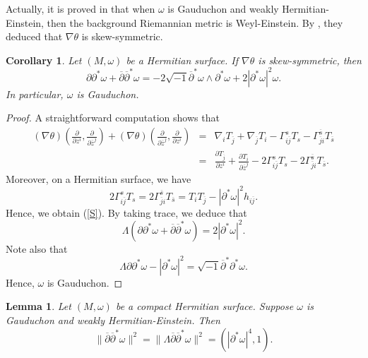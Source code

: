 \documentclass[12pt]{amsart}
\newcommand\bp{{\bar\partial}}
\theoremstyle{plain}
\newtheorem{lemma}[thm]{Lemma}
\newtheorem{cor}[thm]{Corollary}
\theoremstyle{definition}
\newcommand{\bcorollary}{\begin{cor}}
\newcommand{\ecorollary}{\end{cor}}
\newcommand{\bproof}{\begin{proof}}
\newcommand{\eproof}{\end{proof}}
\newcommand{\elemma}{\end{lemma}}
\newcommand{\blemma}{\begin{lemma}}
\newcommand{\sq}{\sqrt{-1}}
\newcommand{\p}{\partial}
\renewcommand{\bar}{\overline}
\newcommand{\beq}{\begin{equation}}
\newcommand{\eeq}{\end{equation}}
\newcommand{\ee}{\end{eqnarray*}}
\newcommand{\be}{\begin{eqnarray*}}
\renewcommand{\bp}{\bar{\partial}}
\renewcommand{\>}{\rightarrow}
\numberwithin{equation}{section} %
\begin{document}
\noindent Actually,  it is proved in \cite[Theorem~1]{Gauduchon1997} that  when $\omega$ is Gauduchon and weakly Hermitian-Einstein, then the background Riemannian metric is Weyl-Einstein. By  \cite[Proposition ~2.2]{Tod1992}, they deduced that $\nabla\theta$ is skew-symmetric.  

\bcorollary Let $(M,\omega)$ be a Hermitian surface. If $\nabla \theta$ is skew-symmetric, then 
\beq \p\p^*\omega+\bp\bp^*\omega=-2\sq \bp^*\omega\wedge \p^*\omega+2|\p^*\omega|^2\omega. \label{S}\eeq 
In particular, $\omega$ is Gauduchon.
\ecorollary
\bproof  A straightforward computation shows that  
\be\left(\nabla \theta\right)\left(\frac{\p }{\p z^i},\frac{\p}{\p\bar z^j}\right) +\left(\nabla \theta\right)\left(\frac{\p}{\p\bar z^j},\frac{\p }{\p z^i}\right)&=&\nabla_i T_{\bar j}+\nabla_{\bar j} T_i-\Gamma_{i\bar j}^s T_s-\Gamma_{\bar j i}^{\bar s} T_{\bar s}\\&=&\frac{\p T_{\bar j}}{\p z^i}+\frac{\p T_{ i}}{\p\bar z^j}-2\Gamma_{i\bar j}^s T_s-2\Gamma_{\bar j i}^{\bar s} T_{\bar s}. \ee
Moreover, on a Hermitian surface, we have 
\beq 2\Gamma_{i\bar j}^s T_s=2\Gamma_{\bar j i}^{\bar s} T_{\bar s}=T_{i}T_{\bar j}-|\p^*\omega|^2 h_{i\bar j}. \eeq
Hence, we obtain  (\ref{S}).  By taking trace, we deduce that $$\Lambda(\p\p^*\omega+\bp\bp^*\omega)=2|\p^*\omega|^2.$$ Note also that $$\Lambda\p\p^*\omega-|\p^*\omega|^2=\sq \bp^*\p^*\omega.$$
Hence, $\omega$ is Gauduchon.
\eproof 





\blemma Let $(M,\omega)$ be a compact Hermitian surface. Suppose $\omega$ is  Gauduchon and weakly Hermitian-Einstein. Then 
\beq \|\bp\bp^*\omega\|^2=\|\Lambda\bp\bp^*\omega\|^2=(|\p^*\omega|^4,1).\eeq 
\elemma 
\end{document}
